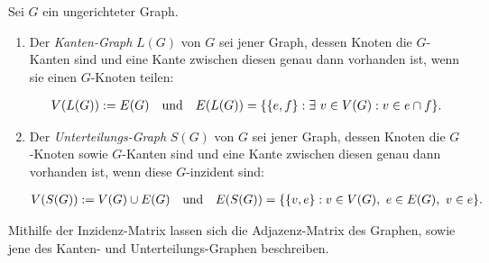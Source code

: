         \begin{definition} \label{def:operations_unary_plus}

            Sei $G$ ein ungerichteter Graph.

            \begin{enumerate}[
                label = \arabic*.,
                wide,
                labelindent = 0pt
            ]

                \item Der \textit{Kanten-Graph} $L(G)$ von $G$ sei jener Graph, dessen Knoten die $G$-Kanten sind und eine Kante zwischen diesen genau dann vorhanden ist, wenn sie einen $G$-Knoten teilen:

                \begin{align*}
                    V(L(G)) := E(G)
                    \quad
                    \text{und}
                    \quad
                    E(L(G)) = {\left \{ {\left \{ e, f \right \}}: \exists ~ v \in V(G): v \in e \cap f \right \}}.
                \end{align*}

                \item Der \textit{Unterteilungs-Graph} $S(G)$ von $G$ sei jener Graph, dessen Knoten die $G$-Knoten sowie $G$-Kanten sind und eine Kante zwischen diesen genau dann vorhanden ist, wenn diese $G$-inzident sind: 

                \begin{align*}
                    V(S(G)) := V(G) \cup E(G)
                    \quad
                    \text{und}
                    \quad
                    E(S(G)) = {\left \{ {\left \{ v, e \right \}}: v \in V(G), ~ e \in E(G), ~ v \in e \right \}}.
                \end{align*}

            \end{enumerate}    

        \end{definition}

        Mithilfe der Inzidenz-Matrix lassen sich die Adjazenz-Matrix des Graphen, sowie jene des Kanten- und Unterteilungs-Graphen beschreiben.

